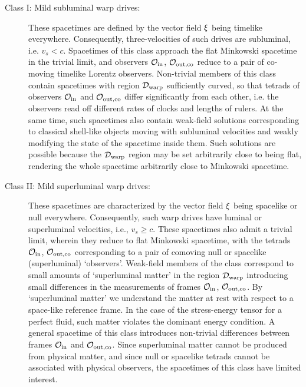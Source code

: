 \documentclass[10pt]{iopart}
\begin{document}
\begin{description}
    \item[Class I: Mild subluminal warp drives:] These spacetimes are defined by the vector field ${\bf \xi}$ being timelike everywhere. Consequently, three-velocities of such drives are subluminal, i.e. $v_s<c$. Spacetimes of this class approach the flat Minkowski spacetime in the trivial limit, and observers $\mathcal{O}_{\rm in}$, $\mathcal{O}_{\rm out, co}$ reduce to a pair of co-moving timelike Lorentz observers. Non-trivial members of this class contain spacetimes with region $\mathcal{D}_{\rm warp}$ sufficiently curved, so that tetrads of observers $\mathcal{O}_{\rm in}$ and  $\mathcal{O}_{\rm out, co}$ differ significantly from each other, i.e. the observers read off different rates of clocks and lengths of rulers. At the same time, such spacetimes also contain weak-field solutions corresponding to classical shell-like objects moving with subluminal velocities and weakly modifying the state of the spacetime inside them. Such solutions are possible because the $\mathcal{D}_{\rm warp}$ region may be set arbitrarily close to being flat, rendering the whole spacetime arbitrarily close to Minkowski spacetime.
    
    \item[Class II: Mild superluminal warp drives:] These spacetimes are characterized by the vector field ${\bf \xi}$ being spacelike or null everywhere. Consequently, such warp drives have luminal or superluminal velocities, i.e., $v_s\geq c$. These spacetimes also admit a trivial limit, wherein they reduce to flat Minkowski spacetime, with the tetrads $\mathcal{O}_{\rm in}$, $\mathcal{O}_{\rm out, co}$ corresponding to a pair of comoving null or spacelike (superluminal) `observers'. Weak-field members of the class correspond to small amounts of `superluminal matter' in the region $\mathcal{D}_{\rm warp}$ introducing small differences in the measurements of frames $\mathcal{O}_{\rm in}$, $\mathcal{O}_{\rm out, co}$. By `superluminal matter' we understand the matter at rest with respect to a space-like reference frame. In the case of the stress-energy tensor for a perfect fluid, such matter violates the dominant energy condition. A general spacetime of this class introduces non-trivial differences between frames $\mathcal{O}_{\rm in}$ and $\mathcal{O}_{\rm out, co}$. Since superluminal matter cannot be produced from physical matter, and since null or spacelike tetrads cannot be associated with physical observers, the spacetimes of this class have limited interest.
    

\end{description}
\end{document}
